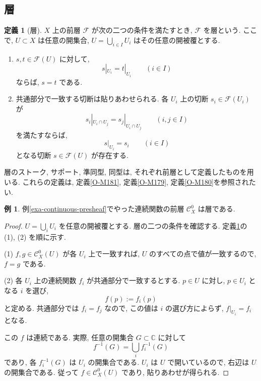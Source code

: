 \documentclass[dvipdfmx,a4paper,11pt]{article} %
\newcommand{\C}{\mathbb{C}}
\theoremstyle{definition}
\numberwithin{equation}{section}
\newtheorem{dfn}[thm]{定義}
\newtheorem{exa}[thm]{例}
\begin{document}
\subsection{層}\label{sec-sheaves}

\begin{dfn}[層]\label{O-M184}
$X$ 上の前層 $\mathcal F$ が次の二つの条件を満たすとき, 
$\mathcal F$ を層という.
ここで, $U\subset X$ は任意の開集合, 
$U=\bigcup_{i\in I}U_i$ はその任意の開被覆とする.
\begin{enumerate}
\item

$s,t\in\mathcal F(U)$ に対して, 
\[
s|_{U_i}=t|_{U_i}\qquad(i\in I)
\]
ならば, $s=t$ である.

\item

共通部分で一致する切断は貼りあわせられる.
各 $U_i$ 上の切断 $s_i\in\mathcal F(U_i)$ が
\[
s_i|_{U_i\cap U_j}=s_j|_{U_i\cap U_j}
\qquad(i,j\in I)
\]
を満たすならば, 
\[
s|_{U_i}=s_i\qquad(i\in I)
\]
となる切断 $s\in\mathcal F(U)$ が存在する.
\end{enumerate}

層のストーク, サポート, 準同型, 同型は, 
それぞれ前層として定義したものを用いる.
これらの定義は, 定義\ref{O-M181}, 定義\ref{O-M179}, 定義\ref{O-M180}を参照されたい.

\end{dfn}


\begin{exa}
例\ref{exa-continuous-presheaf}でやった連続関数の前層 $\mathcal C_X^0$ は層である.
\end{exa}

\begin{proof}
$U=\bigcup_i U_i$ を任意の開被覆とする.
層の二つの条件を確認する.
定義\ref{O-M184}の (1), (2) を順に示す.

(1) $f,g\in\mathcal C_X^0(U)$ が各 $U_i$ 上で一致すれば, 
$U$ のすべての点で値が一致するので, $f=g$ である.

(2) 各 $U_i$ 上の連続関数 $f_i$ が共通部分で一致するとする.
$p\in U$ に対し, $p\in U_i$ となる $i$ を選び, 
\[
f(p):=f_i(p)
\]
と定める.
共通部分では $f_i=f_j$ なので, この値は $i$ の選び方によらず, 
$f|_{U_i}=f_i$ となる.

この $f$ は連続である.
実際, 任意の開集合 $G\subset\C$ に対して
\[
f^{-1}(G)=\bigcup_i f_i^{-1}(G)
\]
であり, 各 $f_i^{-1}(G)$ は $U_i$ の開集合である.
$U_i$ は $U$ で開いているので, 右辺は $U$ の開集合である.
従って $f\in\mathcal C_X^0(U)$ であり, 貼りあわせが得られる.
\end{proof}
\end{document}
